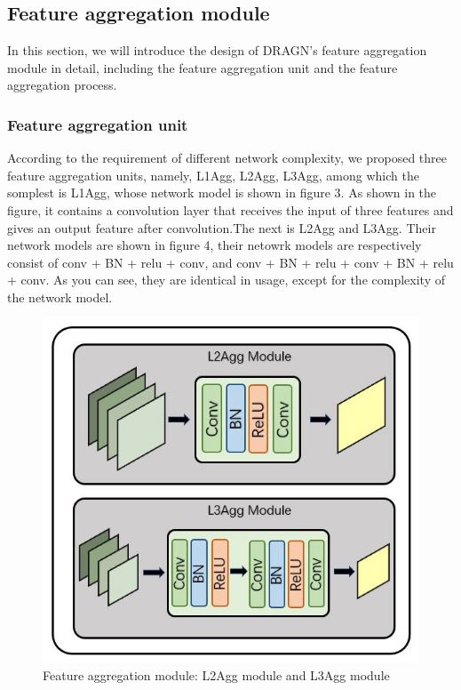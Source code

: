 \documentclass[10pt,twocolumn,letterpaper]{article}
\begin{document}
\subsection{Feature aggregation module}
In this section, we will introduce the design of DRAGN's feature aggregation module in detail, including the feature aggregation unit and the feature aggregation process.

\subsubsection{Feature aggregation unit}
According to the requirement of different network complexity, we proposed three feature aggregation units, namely, L1Agg, L2Agg, L3Agg, among which the somplest is L1Agg, whose network model is shown in figure 3. As shown in the figure, it contains a convolution layer that receives the input of three features and gives an output feature after convolution.The next is L2Agg and L3Agg. Their network models are shown in figure 4, their netowrk models are respectively consist of conv + BN + relu + conv, and conv + BN + relu + conv + BN + relu + conv. As you can see, they are identical in usage, except for the complexity of the network model.

\begin{figure}[t]
\begin{center}
  \includegraphics[width=0.8\linewidth]{figure5.JPG}
\end{center}
   \caption{Feature aggregation module: L2Agg module and L3Agg module }
\label{fig:long}
\label{fig:onecol}
\end{figure}
\end{document}
